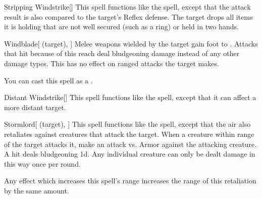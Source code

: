 \lowercase{\hypertarget{spell:Stripping Windstrike}{}}\label{spell:Stripping Windstrike}
\begin{freeability}[Rank 3]{\hypertarget{spell:Stripping Windstrike}{Stripping Windstrike}}[]
This spell functions like the  spell, except that the attack result is also compared to the target's Reflex defense.
\hit The target drops all items it is holding that are not well secured (such as a ring) or held in two hands.
\end{freeability}
\vspace{0.25em}



\lowercase{\hypertarget{spell:Windblade}{}}\label{spell:Windblade}
\begin{attuneability}[Rank 3]{\hypertarget{spell:Windblade}{Windblade}}[ (target), ]
Melee weapons wielded by the target gain  foot  to .
Attacks that hit because of this reach deal bludgeoning damage instead of any other damage types.
This has no effect on ranged attacks the target makes.

You can cast this spell as a .
\end{attuneability}
\vspace{0.25em}



\lowercase{\hypertarget{spell:Distant Windstrike}{}}\label{spell:Distant Windstrike}
\begin{freeability}[Rank 4]{\hypertarget{spell:Distant Windstrike}{Distant Windstrike}}[]
This spell functions like the  spell, except that it can affect a more distant target.
\end{freeability}
\vspace{0.25em}



\lowercase{\hypertarget{spell:Stormlord}{}}\label{spell:Stormlord}
\begin{attuneability}[Rank 4]{\hypertarget{spell:Stormlord}{Stormlord}}[ (target), ]
This spell functions like the  spell, except that the air also retaliates against creatures that attack the target.
When a creature within \rngclose range of the target attacks it, make an attack vs. Armor against the attacking creature.
A hit deals bludgeoning  \minus1d.
Any individual creature can only be dealt damage in this way once per round.

Any effect which increases this spell's range increases the range of this retaliation by the same amount.
\end{attuneability}
\vspace{0.25em}



